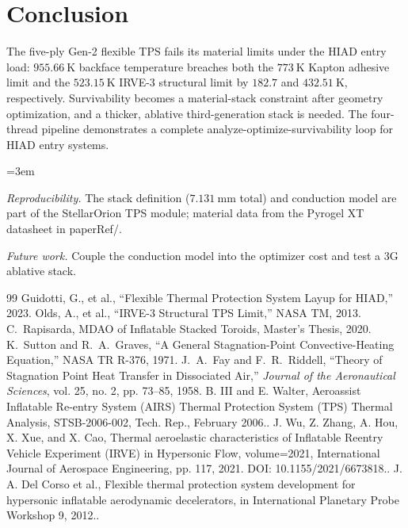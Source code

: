 \documentclass[10pt]{article}
\begin{document}
\section{Conclusion}
The five-ply Gen-2 flexible TPS fails its material limits under the HIAD entry load: $955.66~\mathrm{K}$ backface temperature breaches both the $773~\mathrm{K}$ Kapton adhesive limit and the $523.15~\mathrm{K}$ IRVE-3 structural limit by $182.7$ and $432.51~\mathrm{K}$, respectively. Survivability becomes a material-stack constraint after geometry optimization, and a thicker, ablative third-generation stack is needed. The four-thread pipeline demonstrates a complete analyze-optimize-survivability loop for HIAD entry systems.

\begin{sloppypar} \emergencystretch=3em \raggedright
\noindent\textit{Reproducibility.} The stack definition ($7.131~\mathrm{mm}$ total) and conduction model are part of the StellarOrion TPS module; material data from the Pyrogel XT datasheet in paperRef/.\par\vspace{0.5em}
\noindent\textit{Future work.} Couple the conduction model into the optimizer cost and test a 3G ablative stack.\par\vspace{0.3em}
\begin{thebibliography}{99}
 Guidotti, G., et al., ``Flexible Thermal Protection System Layup for HIAD,'' 2023.
 Olds, A., et al., ``IRVE-3 Structural TPS Limit,'' NASA TM, 2013.
 C.~Rapisarda, MDAO of Inflatable Stacked Toroids, Master's Thesis, 2020.
 K.~Sutton and R.~A.~Graves, ``A General Stagnation-Point Convective-Heating Equation,'' NASA TR R-376, 1971.
 J.~A.~Fay and F.~R.~Riddell, ``Theory of Stagnation Point Heat Transfer in Dissociated Air,'' \emph{Journal of the Aeronautical Sciences}, vol. 25, no. 2, pp. 73--85, 1958.
 B. III and E. Walter, Aeroassist Inflatable Re-entry System (AIRS) Thermal Protection System (TPS) Thermal Analysis, STSB-2006-002, Tech. Rep., February 2006..
 J. Wu, Z. Zhang, A. Hou, X. Xue, and X. Cao, Thermal aeroelastic characteristics of Inflatable Reentry Vehicle Experiment (IRVE) in Hypersonic Flow, volume=2021, International Journal of Aerospace Engineering, pp. 117, 2021. DOI: 10.1155/2021/6673818..
 J. A. Del Corso et al., Flexible thermal protection system development for hypersonic inflatable aerodynamic decelerators, in International Planetary Probe Workshop 9, 2012..

\end{thebibliography}
\end{sloppypar}
\end{document}
